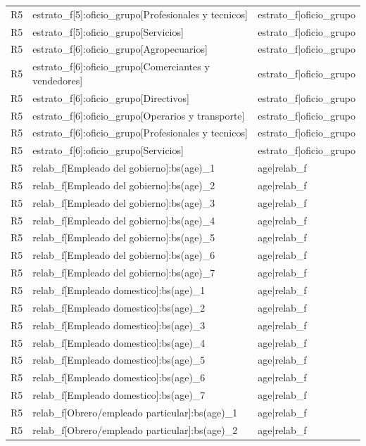 \begin{longtable}{lll}
R5 & estrato\_f[5]:oficio\_grupo[Profesionales y tecnicos] & estrato\_f|oficio\_grupo \\
R5 & estrato\_f[5]:oficio\_grupo[Servicios] & estrato\_f|oficio\_grupo \\
R5 & estrato\_f[6]:oficio\_grupo[Agropecuarios] & estrato\_f|oficio\_grupo \\
R5 & estrato\_f[6]:oficio\_grupo[Comerciantes y vendedores] & estrato\_f|oficio\_grupo \\
R5 & estrato\_f[6]:oficio\_grupo[Directivos] & estrato\_f|oficio\_grupo \\
R5 & estrato\_f[6]:oficio\_grupo[Operarios y transporte] & estrato\_f|oficio\_grupo \\
R5 & estrato\_f[6]:oficio\_grupo[Profesionales y tecnicos] & estrato\_f|oficio\_grupo \\
R5 & estrato\_f[6]:oficio\_grupo[Servicios] & estrato\_f|oficio\_grupo \\
R5 & relab\_f[Empleado del gobierno]:bs(age)\_1 & age|relab\_f \\
R5 & relab\_f[Empleado del gobierno]:bs(age)\_2 & age|relab\_f \\
R5 & relab\_f[Empleado del gobierno]:bs(age)\_3 & age|relab\_f \\
R5 & relab\_f[Empleado del gobierno]:bs(age)\_4 & age|relab\_f \\
R5 & relab\_f[Empleado del gobierno]:bs(age)\_5 & age|relab\_f \\
R5 & relab\_f[Empleado del gobierno]:bs(age)\_6 & age|relab\_f \\
R5 & relab\_f[Empleado del gobierno]:bs(age)\_7 & age|relab\_f \\
R5 & relab\_f[Empleado domestico]:bs(age)\_1 & age|relab\_f \\
R5 & relab\_f[Empleado domestico]:bs(age)\_2 & age|relab\_f \\
R5 & relab\_f[Empleado domestico]:bs(age)\_3 & age|relab\_f \\
R5 & relab\_f[Empleado domestico]:bs(age)\_4 & age|relab\_f \\
R5 & relab\_f[Empleado domestico]:bs(age)\_5 & age|relab\_f \\
R5 & relab\_f[Empleado domestico]:bs(age)\_6 & age|relab\_f \\
R5 & relab\_f[Empleado domestico]:bs(age)\_7 & age|relab\_f \\
R5 & relab\_f[Obrero/empleado particular]:bs(age)\_1 & age|relab\_f \\
R5 & relab\_f[Obrero/empleado particular]:bs(age)\_2 & age|relab\_f \\

\end{longtable}
